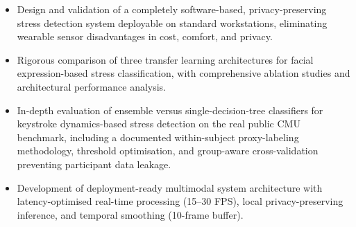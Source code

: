 \documentclass[fleqn,10pt]{wlscirep}
\begin{document}
\begin{itemize}[noitemsep, topsep=0pt, parsep=0pt, partopsep=0pt]
    \item Design and validation of a completely software-based, privacy-preserving stress detection system deployable on standard workstations, eliminating wearable sensor disadvantages in cost, comfort, and privacy.
    \item Rigorous comparison of three transfer learning architectures for facial expression-based stress classification, with comprehensive ablation studies and architectural performance analysis.
    \item In-depth evaluation of ensemble versus single-decision-tree classifiers for keystroke dynamics-based stress detection on the real public CMU benchmark, including a documented within-subject proxy-labeling methodology, threshold optimisation, and group-aware cross-validation preventing participant data leakage.
    \item Development of deployment-ready multimodal system architecture with latency-optimised real-time processing (15--30 FPS), local privacy-preserving inference, and temporal smoothing (10-frame buffer).
\end{itemize}
\end{document}
